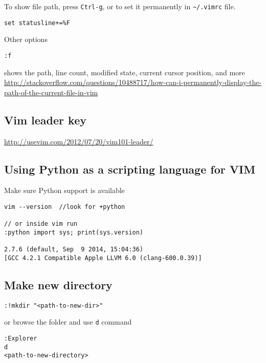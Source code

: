 
To show file path, press \verb!Ctrl-g!, or to set it permanently in
\verb!~/.vimrc! file.

\begin{verbatim}
set statusline+=%F
\end{verbatim}

Other options
\begin{verbatim}
:f
\end{verbatim}
shows the path, line count, modified state, current cursor position, and more
\url{http://stackoverflow.com/questions/10488717/how-can-i-permanently-display-the-path-of-the-current-file-in-vim}


\subsection{Vim leader key}
\label{sec:vim-leader-key}


\url{http://usevim.com/2012/07/20/vim101-leader/}




\subsection{Using Python as a scripting language for VIM}

Make sure Python support is available
\begin{verbatim}
vim --version  //look for +python

// or inside vim run
:python import sys; print(sys.version)

2.7.6 (default, Sep  9 2014, 15:04:36)
[GCC 4.2.1 Compatible Apple LLVM 6.0 (clang-600.0.39)]

\end{verbatim}

\subsection{Make new directory}

\begin{verbatim}
:!mkdir "<path-to-new-dir>"
\end{verbatim}
or browse the folder and use \verb!d! command
\begin{verbatim}
:Explorer
d 
<path-to-new-directory>
\end{verbatim}

